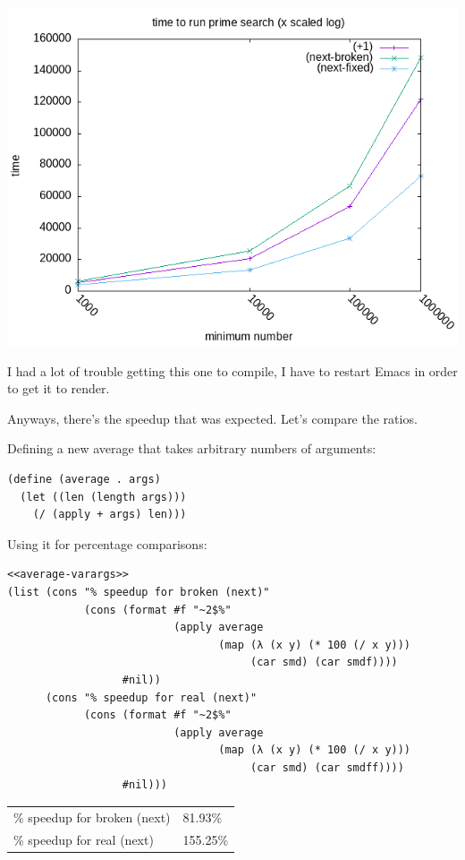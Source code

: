 \documentclass[final,fleqn,titlepage]{article}
\begin{document}
\begin{center}
\includegraphics[width=.9\linewidth]{1/fig/1-22-3.png}
\end{center}

I had a lot of trouble getting this one to compile, I have to restart Emacs in
order to get it to render.

Anyways, there's the speedup that was expected. Let's compare the ratios.

Defining a new average that takes arbitrary numbers of arguments:
\begin{verbatim}
(define (average . args)
  (let ((len (length args)))
    (/ (apply + args) len)))
\end{verbatim}

Using it for percentage comparisons:
\begin{verbatim}
<<average-varargs>>
(list (cons "% speedup for broken (next)"
            (cons (format #f "~2$%"
                          (apply average
                                 (map (λ (x y) (* 100 (/ x y)))
                                      (car smd) (car smdf))))
                  #nil))
      (cons "% speedup for real (next)"
            (cons (format #f "~2$%"
                          (apply average
                                 (map (λ (x y) (* 100 (/ x y)))
                                      (car smd) (car smdff))))
                  #nil)))
\end{verbatim}

\begin{center}
\begin{tabular}{ll}
\% speedup for broken (next) & 81.93\%\\
\% speedup for real (next) & 155.25\%\\
\end{tabular}
\end{center}
\end{document}

